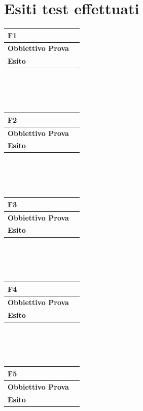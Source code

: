 \documentclass[11pt,titlepage,a4paper]{report}
\begin{document}
\section {Esiti test effettuati}
\begin{tabular}{||p{4.5cm}||p{7.5cm}||}
\hline
\textbf{\textsf{F1}} \\
\hline
{\textbf {Obbiettivo Prova}}& \\ \hline
{\textbf{Esito}}&  \\ \hline
\end{tabular} \\
\\
\\
\begin{tabular}{||p{4.5cm}||p{7.5cm}||}
\hline
\textbf{\textsf{F2}} \\
\hline
{\textbf {Obbiettivo Prova}}& \\ \hline
{\textbf{Esito}}&  \\ \hline
\end{tabular} \\
\\
\\
\begin{tabular}{||p{4.5cm}||p{7.5cm}||}
\hline
\textbf{\textsf{F3}} \\
\hline
{\textbf {Obbiettivo Prova}}& \\ \hline
{\textbf{Esito}}&  \\ \hline
\end{tabular} \\
\\
\\
\begin{tabular}{||p{4.5cm}||p{7.5cm}||}
\hline
\textbf{\textsf{F4}} \\
\hline
{\textbf {Obbiettivo Prova}}& \\ \hline
{\textbf{Esito}}&  \\ \hline
\end{tabular} \\
\\
\\
\begin{tabular}{||p{4.5cm}||p{7.5cm}||}
\hline
\textbf{\textsf{F5}} \\
\hline
{\textbf {Obbiettivo Prova}}& \\ \hline
{\textbf{Esito}}&  \\ \hline
\end{tabular} \\
\\
\end{document}

